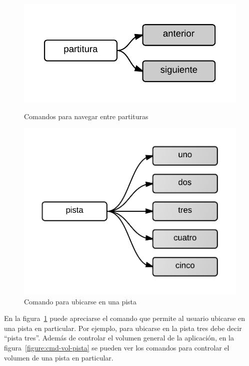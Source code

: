 \begin{figure}[H]
\begin{minipage}[b]{0.5\linewidth}
\centering
\includegraphics[width=0.6\linewidth]{./graphics/partitura-2.png}
\caption{Comandos para navegar entre partituras}
\label{figure:cmd-partitura-2}
\end{minipage}
\quad
\begin{minipage}[b]{0.5\linewidth}
\centering
\includegraphics[width=0.6\linewidth]{./graphics/cmd-pista-1.png}
\caption{Comando para ubicarse en una pista}
\label{figure:cmd-pista-1}
\end{minipage}
\end{figure} 

En la figura~\ref{figure:cmd-pista-1} puede apreciarse el comando que permite al usuario ubicarse en una pista en particular. Por  
ejemplo, para ubicarse en la pista tres debe decir “pista tres”. Adem\'as de controlar el volumen general de la aplicaci\'on, en 
la figura~\ref{figure:cmd-vol-pista} se pueden ver los comandos para controlar el volumen de una pista en particular.

